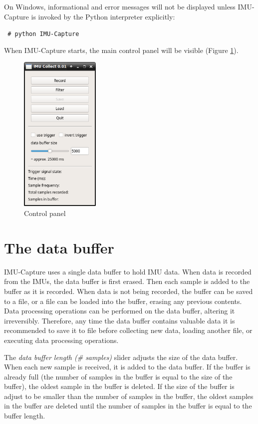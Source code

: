 \documentclass[11pt,letterpaper,article,oneside]{memoir}
\newcommand{\name}{IMU-Capture}
\begin{document}
On Windows, informational and error messages will not be displayed unless
\name{} is invoked by the Python interpreter explicitly:

\texttt{
\# python \name{}
}

When \name{} starts, the main control panel will be visible (Figure
\ref{fig:control}).

\begin{figure}[]
    \begin{center}
        \includegraphics[height=3in]{screenshot_panel}
    \end{center}
    \caption{Control panel} 
    \label{fig:control}
\end{figure}


\chapter{The data buffer} \name{} uses a single data buffer to hold IMU data.
When data is recorded from the IMUs, the data buffer is first erased. Then each
sample is added to the buffer as it is recorded. When data is not being
recorded, the buffer can be saved to a file, or a file can be loaded into the
buffer, erasing any previous contents. Data processing operations can be
performed on the data buffer, altering it irreversibly.  Therefore, any time the
data buffer contains valuable data it is recommended to save it to file before
collecting new data, loading another file, or executing data processing
operations.

The \emph{data buffer length (\# samples)} slider adjusts the size of the data
buffer. When each new sample is received, it is added to the data buffer. If the
buffer is already full (the number of samples in the buffer is equal to the
size of the buffer), the oldest sample in the buffer is deleted. If the size of
the buffer is adjust to be smaller than the number of samples in the buffer, the
oldest samples in the buffer are deleted until the number of samples in the
buffer is equal to the buffer length.
\end{document}
